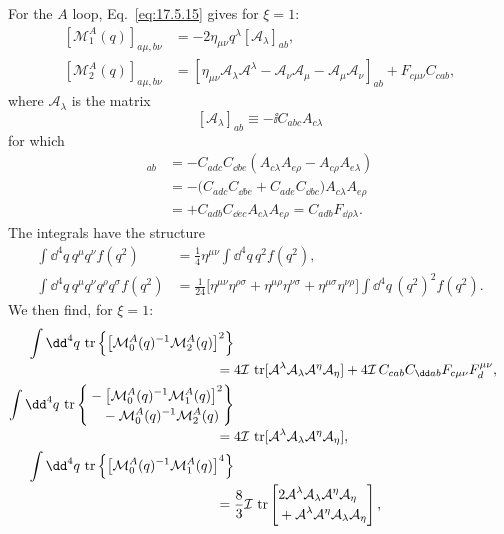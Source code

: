 For the $A$ loop, Eq.~\eqref{eq:17.5.15} gives for $\xi=1$:
\begin{align*}
\left[\mathcal M_1^A(q)\right]_{a\mu,b\nu}
&=-2\eta_{\mu\nu}q^\lambda[\mathcal A_\lambda]_{ab},\\
\left[\mathcal M_2^A(q)\right]_{a\mu,b\nu}
&=\left[\eta_{\mu\nu}\mathcal A_\lambda\mathcal A^\lambda
-\mathcal A_\nu\mathcal A_\mu-\mathcal A_\mu\mathcal A_\nu\right]_{ab}
+F_{c\mu\nu}C_{cab},
\end{align*}
where $\mathcal A_\lambda$ is the matrix
\[
[\mathcal A_\lambda]_{ab}\equiv-\ii C_{abc}A_{c\lambda}
\]
for which
\begin{align*}
[\mathcal A_\lambda,\mathcal A_\rho]_{ab}
&=-C_{adc}C_{\dd be}
(A_{c\lambda}A_{e\rho}-A_{c\rho}A_{e\lambda})\\
&=-\bigl(C_{adc}C_{\dd be}
+C_{ade}C_{\dd bc}\bigr)
A_{c\lambda}A_{e\rho}\\
&=+C_{adb}C_{\dd ec}
A_{c\lambda}A_{e\rho}
=C_{adb}F_{\dd\rho\lambda}.
\end{align*}
The integrals have the structure
\begin{align*}
\int \dd^4q\,q^\mu q^\nu f(q^2)
&=\frac14\eta^{\mu\nu}\int \dd^4q\,q^2f(q^2),\\
\int \dd^4q\,q^\mu q^\nu q^\rho q^\sigma f(q^2)
&=\frac1{24}\bigl[\eta^{\mu\nu}\eta^{\rho\sigma}
+\eta^{\mu\rho}\eta^{\nu\sigma}
+\eta^{\mu\sigma}\eta^{\nu\rho}\bigr]
\int \dd^4q\,(q^2)^2f(q^2).
\end{align*}
We then find, for $\xi=1$:
\begin{align*}
\int \dd^4q\,\operatorname{tr}\left\{
\left[\mathcal M_0^A(q)^{-1}\mathcal M_2^A(q)\right]^2\right\}
\notag\\[-2pt]
={}&4\mathcal I\,\operatorname{tr}
[\mathcal A^\lambda\mathcal A_\lambda\mathcal A^\eta\mathcal A_\eta]
+4\mathcal I\,C_{cab}C_{\dd ab}
F_{c\mu\nu}F_d^{\mu\nu},\\
\int \dd^4q\,\operatorname{tr}\left\{
\begin{aligned}
&-\left[\mathcal M_0^A(q)^{-1}\mathcal M_1^A(q)\right]^2\\[-2pt]
&\quad{}-\mathcal M_0^A(q)^{-1}\mathcal M_2^A(q)
\end{aligned}\right\}
\notag\\[-2pt]
={}&4\mathcal I\,\operatorname{tr}
[\mathcal A^\lambda\mathcal A_\lambda\mathcal A^\eta\mathcal A_\eta],\\
\int \dd^4q\,\operatorname{tr}\left\{
\left[\mathcal M_0^A(q)^{-1}\mathcal M_1^A(q)\right]^4\right\}
\notag\\[-2pt]
={}&\frac83\mathcal I\,\operatorname{tr}
\left[\begin{aligned}
&2\mathcal A^\lambda\mathcal A_\lambda\mathcal A^\eta\mathcal A_\eta\\[-2pt]
&+\mathcal A^\lambda\mathcal A^\eta\mathcal A_\lambda\mathcal A_\eta
\end{aligned}\right],
\end{align*}
